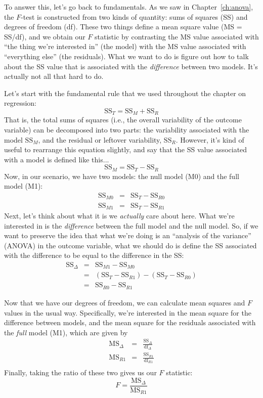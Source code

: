 To answer this, let's go back to fundamentals. As we saw in Chapter~\ref{ch:anova}, the $F$-test is constructed from two kinds of quantity: sums of squares (SS) and degrees of freedom (df). These two things define a mean square value (MS = SS/df), and we obtain our $F$ statistic by contrasting the MS value associated with ``the thing we're interested in'' (the model) with the MS value associated with ``everything else'' (the residuals). What we want to do is figure out how to talk about the SS value that is associated with the {\it difference} between two models. It's actually not all that hard to do. 

Let's start with the fundamental rule that we used throughout the chapter on regression:
$$
\mbox{SS}_{T} = \mbox{SS}_{M} + \mbox{SS}_{R} 
$$
That is, the total sums of squares (i.e., the overall variability of the outcome variable) can be decomposed into two parts: the variability associated with the model $\mbox{SS}_{M}$, and the residual or leftover variability, $\mbox{SS}_{R}$. However, it's kind of useful to rearrange this equation slightly, and say that the SS value associated with a model is defined like this...
$$
\mbox{SS}_{M} = \mbox{SS}_{T} - \mbox{SS}_{R} 
$$
Now, in our scenario, we have two models: the null model (M0) and the full model (M1):
\begin{eqnarray*}
\mbox{SS}_{M0} &=& \mbox{SS}_{T} - \mbox{SS}_{R0} \\
\mbox{SS}_{M1} &=& \mbox{SS}_{T} - \mbox{SS}_{R1} 
\end{eqnarray*} \vspace*{3pt}
Next, let's think about what it is we {\it actually} care about here. What we're interested in is the {\it difference} between the full model and the null model. So, if we want to preserve the idea that what we're doing is an ``analysis of the variance'' (ANOVA) in the outcome variable, what we should do is define the SS associated with the difference to be equal to the difference in the SS:
\begin{eqnarray*}
\mbox{SS}_{\Delta} &=& \mbox{SS}_{M1} - \mbox{SS}_{M0}\\
&=& (\mbox{SS}_{T} - \mbox{SS}_{R1}) - (\mbox{SS}_{T} - \mbox{SS}_{R0} ) \\
&=& \mbox{SS}_{R0} - \mbox{SS}_{R1}
\end{eqnarray*}


Now that we have our degrees of freedom, we can calculate mean squares and $F$ values in the usual way. Specifically, we're interested in the mean square for the difference between models, and the mean square for the residuals associated with the {\it full} model (M1), which are given by
\begin{eqnarray*}
\mbox{MS}_{\Delta} &=& \frac{\mbox{SS}_{\Delta} }{ \mbox{df}_{\Delta} } \\[6pt]
\mbox{MS}_{R1} &=& \frac{ \mbox{SS}_{R1} }{  \mbox{df}_{R1} }\\
\end{eqnarray*}
Finally, taking the ratio of these two gives us our $F$ statistic:
$$
F = \frac{\mbox{MS}_{\Delta}}{\mbox{MS}_{R1}}
$$

